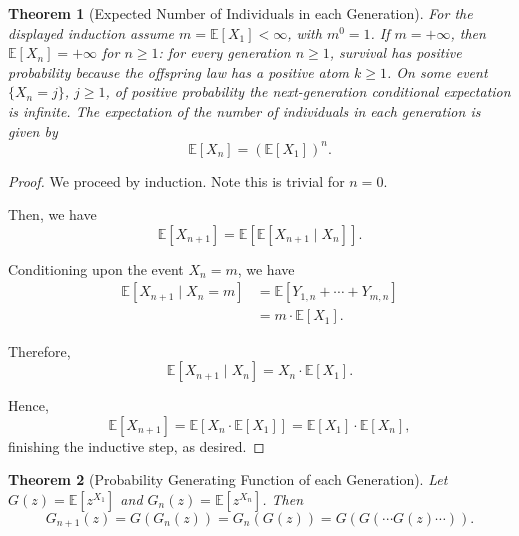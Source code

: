 \documentclass[11pt]{article}
\numberwithin{equation}{section}
\newtheorem{theorem}{Theorem}[section]
\theoremstyle{definition}
\theoremstyle{remark}
\newcommand{\pqty}[1]{\left(#1\right)}
\newcommand{\bqty}[1]{\left[#1\right]}
\newcommand{\Expt}{\mathbb E}
\newcommand{\Conditional}[2]{#1\mid #2}
\begin{document}
\begin{theorem}[Expected Number of Individuals in each Generation]\label{probability-theorem-014}
    \label{probability-thm:branching-process-expt-generation}%
For the displayed induction assume \(m=\Expt[X_1]<\infty\), with \(m^0=1\). If \(m=+\infty\), then \(\Expt[X_n]=+\infty\) for \(n\ge1\): for every generation \(n\ge1\), survival has positive probability because the offspring law has a positive atom \(k\ge1\). On some event \(\{X_n=j\}\), \(j\ge1\), of positive probability the next-generation conditional expectation is infinite.
    The expectation of the number of individuals in each generation is given by
    \[
        \Expt\bqty{X_n} = \pqty{\Expt\bqty{X_1}}^{n}.
    \]
\end{theorem}

\begin{proof}\label{probability-proof-047}
    We proceed by induction. Note this is trivial for \(n = 0\).

    Then, we have
    \[
        \Expt\bqty{X_{n + 1}} = \Expt\bqty{\Expt\bqty{\Conditional{X_{n + 1}}{X_n}}}.
    \]

    Conditioning upon the event \(X_n = m\), we have
    \begin{align*}
        \Expt\bqty{\Conditional{X_{n + 1}}{X_{n} = m}} &= \Expt\bqty{Y_{1, n} + \cdots + Y_{m, n}} \\
        &= m \cdot \Expt\bqty{X_1}.
    \end{align*}

    Therefore,
    \[
        \Expt\bqty{\Conditional{X_{n + 1}}{X_n}} = X_n \cdot \Expt\bqty{X_1}.
    \]

    Hence,
    \[
        \Expt\bqty{X_{n + 1}} = \Expt\bqty{X_n \cdot \Expt\bqty{X_1}} = \Expt\bqty{X_1} \cdot \Expt\bqty{X_n},
    \]
    finishing the inductive step, as desired.
\end{proof}

\begin{theorem}[Probability Generating Function of each Generation]\label{probability-theorem-015}
    \label{probability-thm:branching-processes-pgf}%
    Let \(G\pqty{z} = \Expt\bqty{z^{X_1}}\) and \(G_n\pqty{z} = \Expt\bqty{z^{X_n}}\). Then
    \[
        G_{n + 1} \pqty{z} = G\pqty{G_{n} \pqty{z}} = G_n\pqty{G\pqty{z}} = G\pqty{G\pqty{\cdots G\pqty{z} \cdots}}.
    \]  
\end{theorem}
\end{document}
